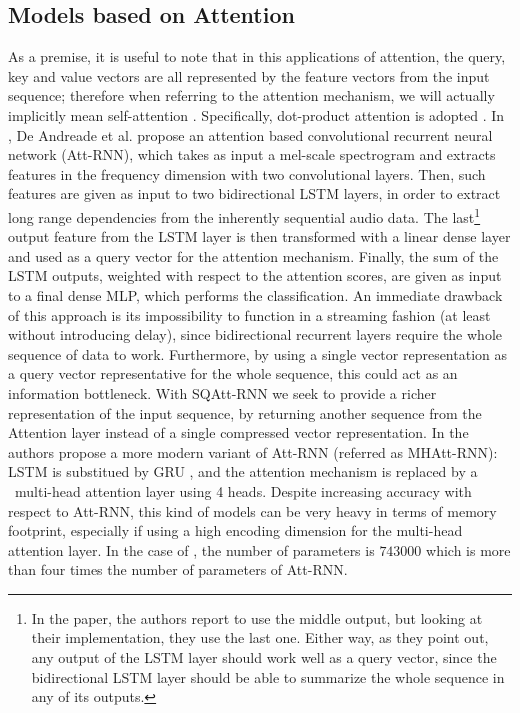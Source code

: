 \subsection{Models based on Attention}
As a premise, it is useful to note that in this applications of attention, the query, key and value vectors are all represented by the feature vectors from the input sequence; therefore when referring to the attention mechanism, we will actually implicitly mean self-attention \cite{selfatt2016cheng}. Specifically, dot-product attention is adopted \cite{luong2015effective}.
In \cite{attention2018andreade}, De Andreade et al. propose an attention based convolutional recurrent neural network (Att-RNN), which takes as input a mel-scale spectrogram and extracts features in the frequency dimension with two convolutional layers. Then, such features are given as input to two bidirectional LSTM \cite{hochreiter1997long} layers, in order to extract long range dependencies from the inherently sequential audio data. The last\footnote{In the paper, the authors report to use the middle output, but looking at their implementation, they use the last one. Either way, as they point out, any output of the LSTM layer should work well as a query vector, since the bidirectional LSTM layer should be able to summarize the whole sequence in any of its outputs.} output feature from the LSTM layer is then transformed with a linear dense layer and used as a query vector for the attention mechanism. Finally, the sum of the LSTM outputs, weighted with respect to the attention scores, are given as input to a final dense MLP, which performs the classification. An immediate drawback of this approach is its impossibility to function in a streaming fashion (at least without introducing delay), since bidirectional recurrent layers require the whole sequence of data to work. Furthermore, by using a single vector representation as a query vector representative for the whole sequence, this could act as an information bottleneck. With SQAtt-RNN we seek to provide a richer representation of the input sequence, by returning another sequence from the Attention layer instead of a single compressed vector representation.
In \cite{streamingkws2020Rybakov} the authors propose a more modern variant of Att-RNN (referred as MHAtt-RNN): LSTM is substitued by GRU \cite{Cho2014gru}, and the attention mechanism is replaced by a ~\mbox{multi-head} attention layer using 4 heads. Despite increasing accuracy with respect to Att-RNN, this kind of models can be very heavy in terms of memory footprint, especially if using a high encoding dimension for the multi-head attention layer. In the case of \cite{streamingkws2020Rybakov}, the number of parameters is $743000$ which is more than four times the number of parameters of Att-RNN.

